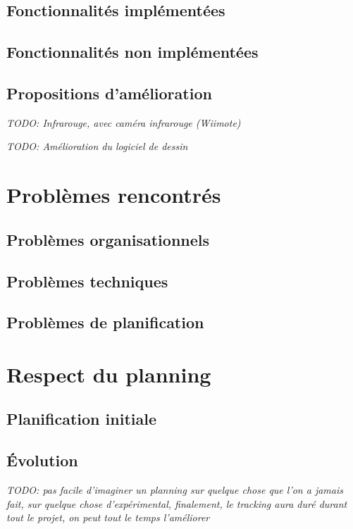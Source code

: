 \documentclass[11pt,a4paper,oldfontcommands]{memoir}
\begin{document}
\subsection{Fonctionnalités implémentées}

\subsection{Fonctionnalités non implémentées}

\subsection{Propositions d'amélioration}

\textit{TODO: Infrarouge, avec caméra infrarouge (Wiimote)}

\textit{TODO: Amélioration du logiciel de dessin}

\section{Problèmes rencontrés}

\subsection{Problèmes organisationnels}

\subsection{Problèmes techniques}

\subsection{Problèmes de planification}

\section{Respect du planning}

\subsection{Planification initiale}

\subsection{Évolution}

\textit{TODO: pas facile d'imaginer un planning sur quelque chose que l'on a jamais fait, sur quelque chose d'expérimental, finalement, le tracking aura duré durant tout le projet, on peut tout le temps l'améliorer}
\end{document}
